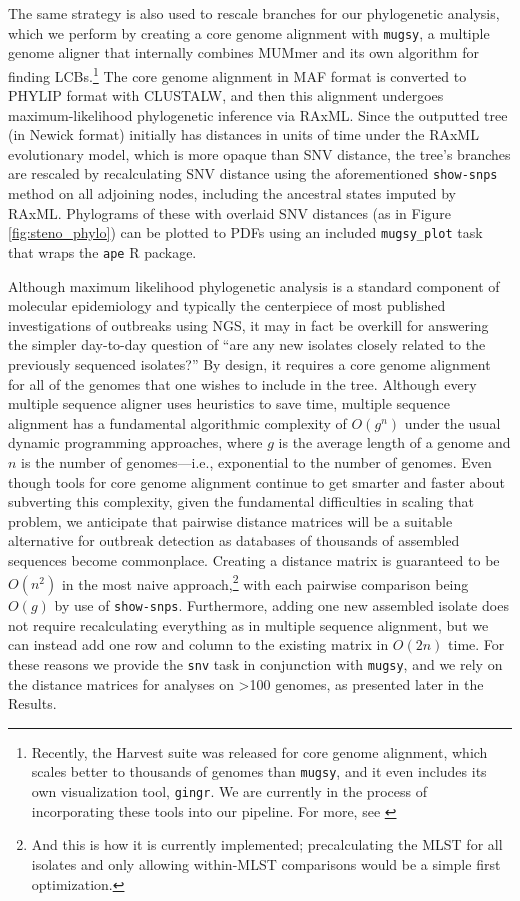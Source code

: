 The same strategy is also used to rescale branches for our phylogenetic analysis, which we perform by creating a core genome alignment with \texttt{mugsy},\autocite{Angiuoli2011a} a multiple genome aligner that internally combines MUMmer and its own algorithm for finding LCBs.\footnote{Recently, the Harvest suite was released for core genome alignment, which scales better to thousands of genomes than \texttt{mugsy}, and it even includes its own visualization tool, \texttt{gingr}. We are currently in the process of incorporating these tools into our pipeline. For more, see \textcite{Treangen2014}} The core genome alignment in MAF format is converted to PHYLIP format with CLUSTALW,\autocite{Sievers2011} and then this alignment undergoes maximum-likelihood phylogenetic inference via RAxML.\autocite{Stamatakis2005} Since the outputted tree (in Newick format) initially has distances in units of time under the RAxML evolutionary model, which is more opaque than SNV distance, the tree's branches are rescaled by recalculating SNV distance using the aforementioned \texttt{show-snps} method on all adjoining nodes, including the ancestral states imputed by RAxML. Phylograms of these with overlaid SNV distances (as in Figure \ref{fig:steno_phylo}) can be plotted to PDFs using an included \verb|mugsy_plot| task that wraps the \texttt{ape} R package.

Although maximum likelihood phylogenetic analysis is a standard component of molecular epidemiology and typically the centerpiece of most published investigations of outbreaks using NGS,\autocite{Azarian2015,Eyre2012,Joensen2014,Casali2016} it may in fact be overkill for answering the simpler day-to-day question of ``are any new isolates closely related to the previously sequenced isolates?'' By design, it requires a core genome alignment for all of the genomes that one wishes to include in the tree. Although every multiple sequence aligner uses heuristics to save time, multiple sequence alignment has a fundamental algorithmic complexity of $O(g^n)$ under the usual dynamic programming approaches,\autocite{Just2004} where $g$ is the average length of a genome and $n$ is the number of genomes—i.e., exponential to the number of genomes. Even though tools for core genome alignment continue to get smarter and faster about subverting this complexity,\autocite{Treangen2014} given the fundamental difficulties in scaling that problem, we anticipate that pairwise distance matrices will be a suitable alternative for outbreak detection as databases of thousands of assembled sequences become commonplace. Creating a distance matrix is guaranteed to be $O(n^2)$ in the most naive approach,\footnote{And this is how it is currently implemented; precalculating the MLST for all isolates and only allowing within-MLST comparisons would be a simple first optimization.} with each pairwise comparison being $O(g)$ by use of \texttt{show-snps}. Furthermore, adding one new assembled isolate does not require recalculating everything as in multiple sequence alignment, but we can instead add one row and column to the existing matrix in $O(2n)$ time. For these reasons we provide the \verb|snv| task in conjunction with \verb|mugsy|, and we rely on the distance matrices for analyses on >100 genomes, as presented later in the Results.

